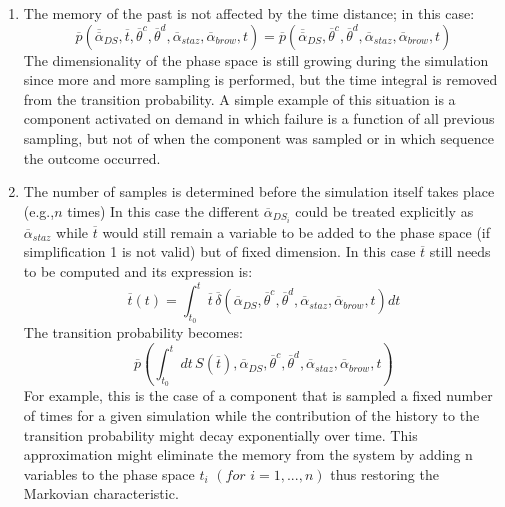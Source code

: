 \begin{enumerate}
  \item The memory of the past is not affected by the time distance; in this case:
  \begin{equation}
   \overline{p}\left ( \overline{\overline{\alpha}}_{DS},\overline{t},\overline{\theta}^{c},\overline{\theta}^{d},\overline{\alpha}_{staz},\overline{\alpha}_{brow},t  \right ) =  \overline{p}\left ( \overline{\overline{\alpha}}_{DS},\overline{\theta}^{c},\overline{\theta}^{d},\overline{\alpha}_{staz},\overline{\alpha}_{brow},t  \right )
  \end{equation}
  The dimensionality of the phase space is still growing during the simulation since more and more sampling is
  performed, but the time integral is removed from the transition probability. A simple example of this situation is
  a component activated on demand in which failure is a function of all previous sampling, but not of when the
  component was sampled or in which sequence the outcome occurred.
  \item  The number of samples is determined before the simulation itself takes place (e.g.,$n$ times) In this case
  the different $\overline{\alpha}_{DS_{i}}$ could be treated explicitly as $\overline{\alpha}_{staz}$   while
  $\overline{t}$ would still remain a variable to be added to the phase space (if simplification 1 is not valid) but of
  fixed dimension. In this case $\overline{t}$ still needs to be computed and its expression is:
  \begin{equation}
   \overline{t} \left ( t \right ) = \int_{t_{0}}^{t} \overline{t}  \, \overline{\delta }\left ( \overline{\alpha }_{DS},
   \overline{\theta}^{c},\overline{\theta}^{d},\overline{\alpha}_{staz},\overline{\alpha}_{brow},t \right )  dt
  \end{equation}
  The transition probability becomes:
  \begin{equation}
     \overline{p}\left ( \int_{t_{0}}^{t} dt\, S\left ( \overline{t} \right ), \overline{\alpha}_{DS}, \overline{\theta}^{c},
     \overline{\theta}^{d},\overline{\alpha}_{staz},\overline{\alpha}_{brow},t \right )
  \end{equation}
  For example, this is the case of a component that is sampled a fixed number of times for a given simulation
  while the contribution of the history to the transition probability might decay exponentially over time. This
  approximation might eliminate the memory from the system by adding n variables to the phase space $t_{i} \, \,
  (for \, \, i=1,...,n)$ thus restoring the Markovian characteristic.

\end{enumerate}
